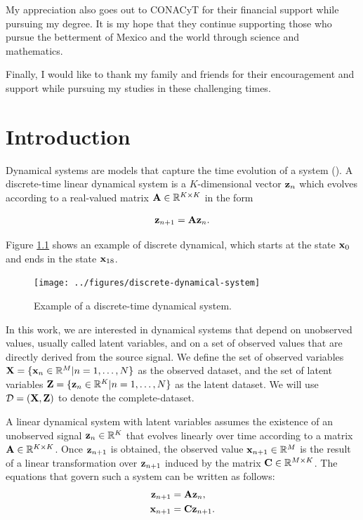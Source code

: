 \documentclass[12pt, oneside]{book}
\numberwithin{equation}{section}
\newcommand{\x}{{\bf x}}
\newcommand{\X}{{\bf X}}
\newcommand{\z}{{\bf z}}
\newcommand{\Z}{{\bf Z}}
\newcommand{\R}{\mathbb{R}}
\begin{document}
My appreciation also goes out to CONACyT for their financial support while pursuing my degree. It is my hope that they continue supporting those who pursue the betterment of Mexico and the world through science and mathematics.

Finally, I would like to thank my family and friends for their encouragement and support while pursuing my studies in these challenging times.

\tableofcontents

\chapter{Introduction}

Dynamical systems are models that capture the time evolution of a system (\cite{strogatz}). A discrete-time linear dynamical system is a $K$-dimensional vector $\z_n$ which evolves according to a real-valued matrix ${\bf A}\in\R^{K\times K}$ in the form

\begin{equation}
	\z_{n+1} = {\bf A}\z_n.
\end{equation}

Figure \ref{fig:discrete-dynamical-system} shows an example of discrete dynamical, which starts at the state $\x_0$ and ends in the state $
\x_{18}$.

\begin{figure}[h!]
	\centering
	\texttt{[image: ../figures/discrete-dynamical-system]}
	\caption{Example of a discrete-time dynamical system.}
	\label{fig:discrete-dynamical-system}
\end{figure}



In this work, we are interested in dynamical systems that depend on unobserved values, usually called latent variables, and on a set of observed values that are directly derived from the source signal. We define the set of observed variables $\X = \{\x_n \in \mathbb{R}^M \vert n=1,\ldots, N\}$ as the observed dataset, and the set of latent variables $\Z = \{\z_n \in \mathbb{R}^K \vert n=1,\ldots, N\}$ as the latent dataset. We will use $\mathcal{D} = ({\bf X}, {\bf Z})$ to denote the complete-dataset.

A linear dynamical system with latent variables assumes the existence of an unobserved signal $\z_n \in \mathbb{R}^K$ that evolves linearly over time according to a matrix ${\bf A}\in\mathbb{R}^{K\times K}$. Once $\z_{n+1}$ is obtained, the observed value $\x_{n+1} \in \mathbb{R}^M$ is the result of a linear transformation over $\z_{n+1}$ induced by the matrix ${\bf C}\in \mathbb{R}^{M\times K}$. The equations that govern such a system can be written as follows:
\begin{align*}
	\z_{n+1} &= {\bf A} \z_{n},\\
	\x_{n+1} &= {\bf C} \z_{n+1}.
\end{align*}
\end{document}
